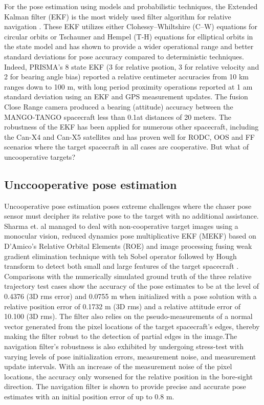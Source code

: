 For the pose estimation using models and probabilistic techniques, the Extended Kalman filter (EKF) is the most widely used filter algorithm for relative navigation \cite{dAmicoPrisma11,karlgaardAdaptiveEkf11}. These EKF utilizes either Clohessy–Whiltshire (C–W) equations \cite{CW} for circular orbits or Tschauner and Hempel (T-H) equations \cite{Tschauner65} for elliptical orbits in the state model and has shown to provide a wider operational range and better standard deviations for pose accuracy compared to deterministic techniques. Indeed, PRISMA's  8 state EKF (3 for relative psotion, 3 for relative velocity and 2 for bearing angle bias) reported a relative centimeter accuracies from  10 km ranges down to 100 m, with long period proximity operations reported at 1 am standard deviation \cite{bodinPrisma12} using an EKF and GPS measurement updates. The fusion Close Range camera produced a bearing (attitude) accuracy between the MANGO-TANGO spacecraft less than 0.1\textdegree at distances of 20 meters. The robustness of the EKF has been applied for numerous other spacecraft, including the Can-X4 and Can-X5 satellites \cite{boninCanX} and has proven well for RODC, OOS and FF scenarios where the target spacecraft in all cases are cooperative. But what of uncooperative targets?

\subsection{Unccooperative pose estimation}\label{CHAP1_3_0}
Uncooperative pose estimation poses extreme challenges where the chaser pose sensor must decipher its relative pose to the target with no additional assistance. Sharma et. al managed to deal with non-cooperative target images using a monocular vision, reduced  dynamics pose multiplicative EKF (MEKF) based on D'Amico's Relative Orbital Elements (ROE) \cite{dAmicoPhdthesis} and image processing fusing weak gradient elimination technique with teh Sobel operator followed by Hough transform to detect both small and large features of the target spacecraft \cite{sharmePoseNonC17a}. Comparisons with the numerically simulated ground truth of the three relative trajectory test cases show the accuracy of the pose estimates to be at the level of 0.4376 \textdegree (3D rms error) and 0.0755 m when initialized with a pose solution with a relative position error of 0.1732 m (3D rms) and a relative attitude
error of 10.100 \textdegree (3D rms). The filter also relies on the pseudo-measurements of a normal vector generated from the pixel locations of the target spacecraft’s edges, thereby making the filter robust to the detection of partial edges in the image.The navigation filter’s robustness is also exhibited by undergoing stress-test with varying levels of pose initialization errors, measurement noise, and measurement update intervals. With an increase of the measurement noise of the pixel locations, the accuracy only worsened for the relative position in the bore-sight direction. The navigation filter is shown to provide precise and accurate pose estimates with an initial position error of up to 0.8 m.  

